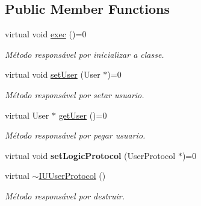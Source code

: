 \subsection*{Public Member Functions}
\begin{DoxyCompactItemize}
\item 
\hypertarget{class_i_u_user_protocol_a10759062ea5be83d3beb94fb765b77b8}{virtual void \hyperlink{class_i_u_user_protocol_a10759062ea5be83d3beb94fb765b77b8}{exec} ()=0}\label{class_i_u_user_protocol_a10759062ea5be83d3beb94fb765b77b8}

\begin{DoxyCompactList}\small\item\em Método responsável por inicializar a classe. \end{DoxyCompactList}\item 
\hypertarget{class_i_u_user_protocol_aef57f2179f890cbb1d9010b491033fcf}{virtual void \hyperlink{class_i_u_user_protocol_aef57f2179f890cbb1d9010b491033fcf}{set\-User} (User $\ast$)=0}\label{class_i_u_user_protocol_aef57f2179f890cbb1d9010b491033fcf}

\begin{DoxyCompactList}\small\item\em Método responsável por setar usuario. \end{DoxyCompactList}\item 
\hypertarget{class_i_u_user_protocol_aceaf5a48595a80d71ef2f90fa185b488}{virtual User $\ast$ \hyperlink{class_i_u_user_protocol_aceaf5a48595a80d71ef2f90fa185b488}{get\-User} ()=0}\label{class_i_u_user_protocol_aceaf5a48595a80d71ef2f90fa185b488}

\begin{DoxyCompactList}\small\item\em Método responsável por pegar usuario. \end{DoxyCompactList}\item 
\hypertarget{class_i_u_user_protocol_aeee75f26805eff9a23319bae1b12ba82}{virtual void {\bfseries set\-Logic\-Protocol} (User\-Protocol $\ast$)=0}\label{class_i_u_user_protocol_aeee75f26805eff9a23319bae1b12ba82}

\item 
\hypertarget{class_i_u_user_protocol_ac74905386db12ce833eb85a2251d96fb}{virtual \hyperlink{class_i_u_user_protocol_ac74905386db12ce833eb85a2251d96fb}{$\sim$\-I\-U\-User\-Protocol} ()}\label{class_i_u_user_protocol_ac74905386db12ce833eb85a2251d96fb}

\begin{DoxyCompactList}\small\item\em Método responsável por destruir. \end{DoxyCompactList}\end{DoxyCompactItemize}



